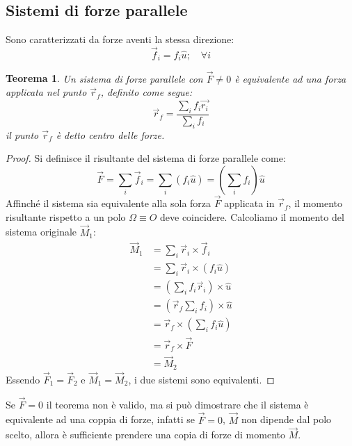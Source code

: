 \documentclass[11pt, a4paper, openright]{book}
\theoremstyle{plain}
\newtheorem{theorem}{Teorema}[section]
\theoremstyle{definition}
\begin{document}
\subsection{Sistemi di forze parallele}
Sono caratterizzati da forze aventi la stessa direzione:
\begin{equation}
    \vec{f}_i = f_i \hat{u}; \quad \forall i
\end{equation}


\begin{theorem}
    Un sistema di forze parallele con $\vec{F} \not = 0$ è equivalente ad una forza applicata nel punto $\vec{r}_f$, definito come segue:
        \begin{equation}
            \vec{r}_f = \frac{\sum_i f_i \vec{r_i}}{\sum_i f_i}
        \end{equation}
    il punto $\vec{r}_f$ è detto centro delle forze.
\end{theorem}
\begin{proof}
    Si definisce il risultante del sistema di forze parallele come:
    \begin{equation}
        \vec{F} = \sum_i \vec{f}_i = \sum_i (f_i \hat{u}) = \left( \sum_i f_i \right) \hat{u}
    \end{equation}
    Affinché il sistema sia equivalente alla sola forza $\vec{F}$ applicata in $\vec{r}_f$, il momento risultante rispetto a un polo $\Omega \equiv O$ deve coincidere. 
    Calcoliamo il momento del sistema originale $\vec{M}_1$:
    \begin{align}
        \vec{M}_1 & = \sum_i \vec{r}_i \times \vec{f}_i \\
        & = \sum_i \vec{r}_i \times (f_i \hat{u}) \\
        & = \left( \sum_i f_i \vec{r}_i \right) \times \hat{u}  \\
        & = \left( \vec{r}_f \sum_i f_i \right) \times \hat{u} \\
        & = \vec{r}_f \times \left( \sum_i f_i \hat{u} \right) \\
        & = \vec{r}_f \times \vec{F} \\
        & = \vec{M}_2
    \end{align}
    Essendo $\vec{F}_1 = \vec{F}_2$ e $\vec{M}_1 = \vec{M}_2$, i due sistemi sono equivalenti.
\end{proof}    

Se $\vec{F} = 0$ il teorema non è valido, ma si può dimostrare che il sistema è equivalente ad una coppia di forze, infatti se $\vec{F} = 0$, $\vec{M}$ non dipende dal polo scelto, allora è sufficiente prendere una copia di forze di momento $\vec{M}$.
\end{document}
